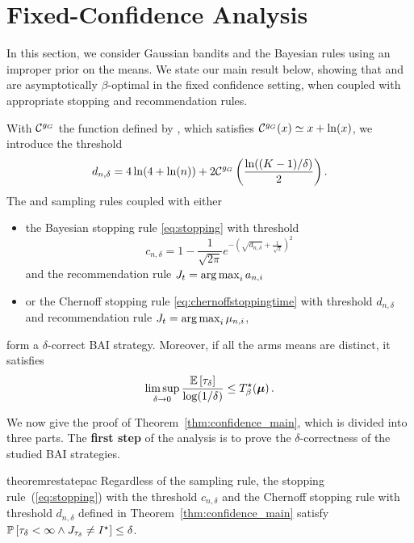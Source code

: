 \section{Fixed-Confidence Analysis}\label{sec:t3c.confidence}

In this section, we consider Gaussian bandits and the Bayesian rules using an improper prior on the means.
We state our main result below, showing that \TTTS and \TCC are asymptotically $\beta$-optimal in the fixed confidence setting, when coupled with appropriate stopping and recommendation rules. 

\begin{theorem}\label{thm:confidence_main} 
\begin{leftbar}[theorembar]
With $\mathcal{C}^{g_G}$ the function defined by \cite{kaufmann2018mixture}, which satisfies $\mathcal{C}^{g_G}(x) \simeq x+\ln(x)$, we introduce the threshold
\begin{equation}d_{n,\delta} = 4\ln(4+\ln(n)) + 2 \mathcal{C}^{g_G}\left(\frac{\ln((K-1)/\delta)}{2}\right).\label{def:thresholdD}\end{equation}
The \TTTS and \TCC sampling rules coupled with either   
\begin{itemize}
 \item the Bayesian stopping rule \eqref{eq:stopping} with threshold \[c_{n,\delta} = 1 - \frac{1}{\sqrt{2\pi}} e^{-\left(\sqrt{d_{n,\delta}} + \frac{1}{\sqrt{2}}\right)^2}\]
 and the recommendation rule $J_t = \operatorname*{arg\,max}_{i} a_{n,i}$
  \item or the Chernoff stopping rule \eqref{eq:chernoffstoppingtime} with threshold $d_{n,\delta}$
 and recommendation rule $J_t = \operatorname*{arg\,max}_i \mu_{n,i}$,
\end{itemize}
form a $\delta$-correct BAI strategy. Moreover, if all the arms means are distinct, it satisfies  
    \[
        \limsup_{\delta\rightarrow{0}} \frac{\mathbb{E}\left[\tau_{\delta}\right]}{\log(1/\delta)} \leq T_{\beta}^\star({\boldsymbol \mu})\,.
    \]
\end{leftbar}
\end{theorem}

We now give the proof of Theorem~\ref{thm:confidence_main}, which is divided into three parts. The \textbf{first step} of the analysis is to prove the $\delta$-correctness of the studied BAI strategies.

\begin{restatable}{theorem}{restatepac}\label{thm:pac_gaussian}
    Regardless of the sampling rule, the stopping rule~(\ref{eq:stopping}) with the threshold $c_{n,\delta}$ and the Chernoff stopping rule with threshold $d_{n,\delta}$ defined in Theorem~\ref{thm:confidence_main} satisfy $        \mathbb{P}\left[\tau_{\delta} < \infty \wedge J_{\tau_{\delta}} \neq I^\star\right] \leq \delta$.
\end{restatable}

